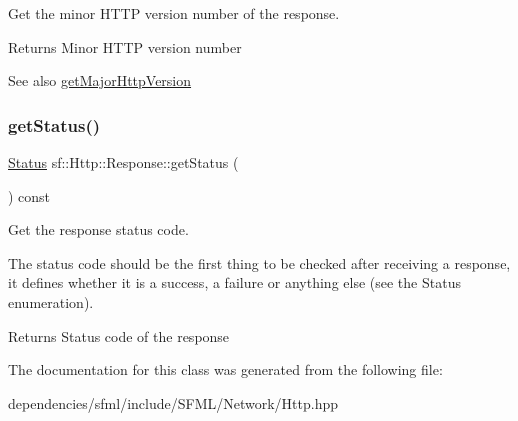 Get the minor H\+T\+TP version number of the response. 

\begin{DoxyReturn}{Returns}
Minor H\+T\+TP version number
\end{DoxyReturn}
\begin{DoxySeeAlso}{See also}
\hyperlink{classsf_1_1_http_1_1_response_ab1c6948f6444fad34d0537e206e398b8}{get\+Major\+Http\+Version} 
\end{DoxySeeAlso}
\mbox{\label{classsf_1_1_http_1_1_response_a4271651703764fd9a7d2c0315aff20de}} 
\subsubsection{\texorpdfstring{get\+Status()}{getStatus()}}
{\footnotesize\ttfamily \hyperlink{classsf_1_1_http_1_1_response_a663e071978e30fbbeb20ed045be874d8}{Status} sf\+::\+Http\+::\+Response\+::get\+Status (\begin{DoxyParamCaption}{ }\end{DoxyParamCaption}) const}



Get the response status code. 

The status code should be the first thing to be checked after receiving a response, it defines whether it is a success, a failure or anything else (see the Status enumeration).

\begin{DoxyReturn}{Returns}
Status code of the response 
\end{DoxyReturn}


The documentation for this class was generated from the following file\+:\begin{DoxyCompactItemize}
\item 
dependencies/sfml/include/\+S\+F\+M\+L/\+Network/Http.\+hpp\end{DoxyCompactItemize}
